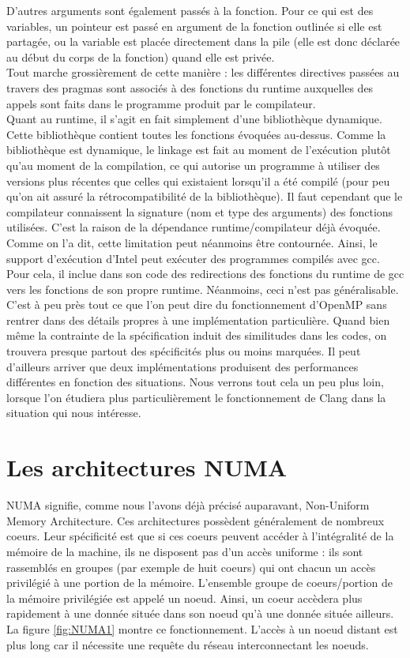 \documentclass{report}
\begin{document}
D'autres arguments sont également passés à la fonction. Pour ce qui est des variables, un pointeur est
passé en argument de la fonction outlinée si elle est partagée, ou la variable est placée directement
dans la pile (elle est donc déclarée au début du corps de la fonction) quand elle est privée.
\\Tout marche grossièrement de cette manière : les différentes directives passées au travers des pragmas
sont associés à des fonctions du runtime auxquelles des appels sont faits dans le programme produit par
le compilateur. 
\\Quant au runtime, il s'agit en fait simplement d'une bibliothèque dynamique. Cette bibliothèque 
contient toutes les fonctions évoquées au-dessus. Comme la bibliothèque est dynamique, le linkage est fait
au moment de l'exécution plutôt qu'au moment de la compilation, ce qui autorise un programme à utiliser
des versions plus récentes que celles qui existaient lorsqu'il a été compilé (pour peu qu'on ait assuré
la rétrocompatibilité de la bibliothèque). Il faut cependant que le compilateur connaissent la signature
(nom et type des arguments) des fonctions utilisées. C'est la raison de la dépendance runtime/compilateur
déjà évoquée. Comme on l'a dit, cette limitation peut néanmoins être contournée. Ainsi, le support 
d'exécution d'Intel peut exécuter des programmes compilés avec gcc. Pour cela, il inclue dans son code
des redirections des fonctions du runtime de gcc vers les fonctions de son propre runtime. Néanmoins,
ceci n'est pas généralisable.
\\C'est à peu près tout ce que l'on peut dire du fonctionnement d'OpenMP sans rentrer dans des détails
propres à une implémentation particulière. Quand bien même la contrainte de la spécification induit des
similitudes dans les codes, on trouvera presque partout des spécificités plus ou moins marquées. Il peut
d'ailleurs arriver que deux implémentations produisent des performances différentes en fonction des
situations. Nous verrons tout cela un peu plus loin, lorsque l'on étudiera plus particulièrement
le fonctionnement de Clang dans la situation qui nous intéresse.

\section{Les architectures NUMA}
NUMA signifie, comme nous l'avons déjà précisé auparavant, Non-Uniform Memory Architecture. Ces 
architectures possèdent généralement de nombreux coeurs. Leur spécificité est que si ces coeurs 
peuvent accéder à l'intégralité de la mémoire de la machine, ils ne disposent pas d'un accès uniforme : 
ils sont rassemblés en groupes (par exemple de huit coeurs) qui ont chacun un accès privilégié à une 
portion de la mémoire. L'ensemble groupe de coeurs/portion de la mémoire privilégiée est appelé un 
noeud. Ainsi, un coeur accèdera plus rapidement à une donnée située dans son noeud qu'à une donnée 
située ailleurs. La figure \ref{fig:NUMA1} montre ce fonctionnement. L'accès à un noeud distant 
est plus long car il nécessite une requête du réseau interconnectant les noeuds.
\end{document}
